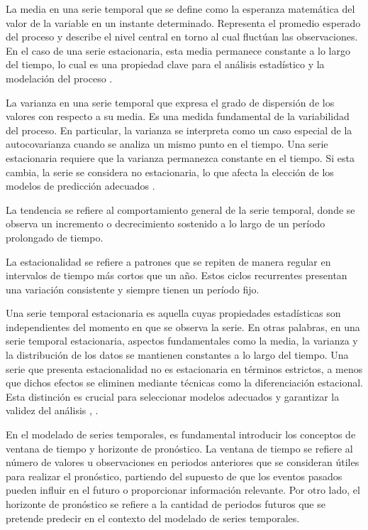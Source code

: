 La media en una serie temporal que se define como la esperanza matemática del valor de la variable en un instante determinado. Representa el promedio esperado del proceso y describe el nivel central en torno al cual fluctúan las observaciones. En el caso de una serie estacionaria, esta media permanece constante a lo largo del tiempo, lo cual es una propiedad clave para el análisis estadístico y la modelación del proceso \cite{box2015time}.


La varianza en una serie temporal que expresa el grado de dispersión de los valores con respecto a su media. Es una medida fundamental de la variabilidad del proceso. En particular, la varianza se interpreta como un caso especial de la autocovarianza cuando se analiza un mismo punto en el tiempo. Una serie estacionaria requiere que la varianza permanezca constante en el tiempo. Si esta cambia, la serie se considera no estacionaria, lo que afecta la elección de los modelos de predicción adecuados \cite{box2015time}.


La tendencia se refiere al comportamiento general de la serie temporal, donde se observa un incremento o decrecimiento sostenido a lo largo de un período prolongado de tiempo.

La estacionalidad se refiere a patrones que se repiten de manera regular en intervalos de tiempo más cortos que un año. Estos ciclos recurrentes presentan una variación consistente y siempre tienen un período fijo.

Una serie temporal estacionaria es aquella cuyas propiedades estadísticas son independientes del momento en que se observa la serie. En otras palabras, en una serie temporal estacionaria, aspectos fundamentales como la media, la varianza y la distribución de los datos se mantienen constantes a lo largo del tiempo. Una serie que presenta estacionalidad no es estacionaria en términos estrictos, a menos que dichos efectos se eliminen mediante técnicas como la diferenciación estacional. Esta distinción es crucial para seleccionar modelos adecuados y garantizar la validez del análisis \cite{hyndman}, \cite{shumway2011time}.


En el modelado de series temporales, es fundamental introducir los conceptos de ventana de tiempo y horizonte de pronóstico. La ventana de tiempo se refiere al número de valores u observaciones en periodos anteriores que se consideran útiles para realizar el pronóstico, partiendo del supuesto de que los eventos pasados pueden influir en el futuro o proporcionar información relevante. Por otro lado, el horizonte de pronóstico se refiere a la cantidad de periodos futuros que se pretende predecir en el contexto del modelado de series temporales.

